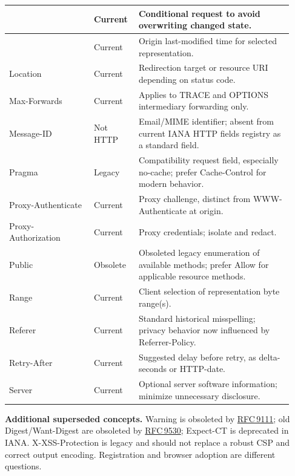 \documentclass[10pt,letterpaper,oneside]{article}
\newcommand{\field}[1]{{\ttfamily\small\color{Deep}#1}}
\newcommand{\rf}[1]{\href{https://www.rfc-editor.org/rfc/rfc#1.html}{RFC\,#1}}
\begin{document}
\begin{longtable}{>{\RaggedRight\arraybackslash}p{0.29\linewidth}>{\RaggedRight\arraybackslash}p{0.13\linewidth}>{\RaggedRight\arraybackslash}p{0.51\linewidth}}
{\ttfamily\color{Deep}If-\allowbreak{}Unmodified-\allowbreak{}Since} & {\sffamily\scriptsize Current} & Conditional request to avoid overwriting changed state. \\ \midrule
{\ttfamily\color{Deep}Last-\allowbreak{}Modified} & {\sffamily\scriptsize Current} & Origin last-modified time for selected representation. \\ \midrule
{\ttfamily\color{Deep}Location} & {\sffamily\scriptsize Current} & Redirection target or resource URI depending on status code. \\ \midrule
{\ttfamily\color{Deep}Max-\allowbreak{}Forwards} & {\sffamily\scriptsize Current} & Applies to TRACE and OPTIONS intermediary forwarding only. \\ \midrule
{\ttfamily\color{Deep}Message-\allowbreak{}ID} & {\sffamily\scriptsize Not HTTP} & Email/MIME identifier; absent from current IANA HTTP fields registry as a standard field. \\ \midrule
{\ttfamily\color{Deep}Pragma} & {\sffamily\scriptsize Legacy} & Compatibility request field, especially no-cache; prefer Cache-Control for modern behavior. \\ \midrule
{\ttfamily\color{Deep}Proxy-\allowbreak{}Authenticate} & {\sffamily\scriptsize Current} & Proxy challenge, distinct from WWW-Authenticate at origin. \\ \midrule
{\ttfamily\color{Deep}Proxy-\allowbreak{}Authorization} & {\sffamily\scriptsize Current} & Proxy credentials; isolate and redact. \\ \midrule
{\ttfamily\color{Deep}Public} & {\sffamily\scriptsize Obsolete} & Obsoleted legacy enumeration of available methods; prefer Allow for applicable resource methods. \\ \midrule
{\ttfamily\color{Deep}Range} & {\sffamily\scriptsize Current} & Client selection of representation byte range(s). \\ \midrule
{\ttfamily\color{Deep}Referer} & {\sffamily\scriptsize Current} & Standard historical misspelling; privacy behavior now influenced by Referrer-Policy. \\ \midrule
{\ttfamily\color{Deep}Retry-\allowbreak{}After} & {\sffamily\scriptsize Current} & Suggested delay before retry, as delta-seconds or HTTP-date. \\ \midrule
{\ttfamily\color{Deep}Server} & {\sffamily\scriptsize Current} & Optional server software information; minimize unnecessary disclosure. \\ \midrule
\bottomrule\end{longtable}\endgroup
\begin{tipbox}\textbf{Additional superseded concepts.} \field{Warning} is obsoleted by \rf{9111}; old \field{Digest}/\field{Want-Digest} are obsoleted by \rf{9530}; \field{Expect-CT} is deprecated in IANA. \field{X-XSS-Protection} is legacy and should not replace a robust CSP and correct output encoding. Registration and browser adoption are different questions.\end{tipbox}
\end{document}
